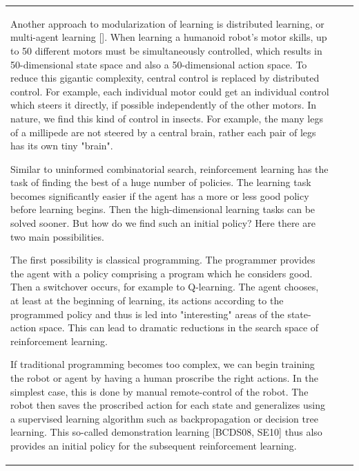 \documentclass[10pt]{book}
\begin{document}
\begin{center}
\begin{tabular}{|l|l|l|}
Another approach to modularization of learning is distributed learning, or multi-agent learning [\cite{pl05}]. When learning a humanoid robot's motor skills, up to 50 different motors must be simultaneously controlled, which results in 50-dimensional state space and also a 50-dimensional action space. To reduce this gigantic complexity, central control is replaced by distributed control. For example, each individual motor could get an individual control which steers it directly, if possible independently of the other motors. In nature, we find this kind of control in insects. For example, the many legs of a millipede are not steered by a central brain, rather each pair of legs has its own tiny "brain".

Similar to uninformed combinatorial search, reinforcement learning has the task of finding the best of a huge number of policies. The learning task becomes significantly easier if the agent has a more or less good policy before learning begins. Then the high-dimensional learning tasks can be solved sooner. But how do we find such an initial policy? Here there are two main possibilities.

The first possibility is classical programming. The programmer provides the agent with a policy comprising a program which he considers good. Then a switchover occurs, for example to Q-learning. The agent chooses, at least at the beginning of learning, its actions according to the programmed policy and thus is led into "interesting" areas of the state-action space. This can lead to dramatic reductions in the search space of reinforcement learning.

If traditional programming becomes too complex, we can begin training the robot or agent by having a human proscribe the right actions. In the simplest case, this is done by manual remote-control of the robot. The robot then saves the proscribed action for each state and generalizes using a supervised learning algorithm such as backpropagation or decision tree learning. This so-called demonstration learning [BCDS08, SE10] thus also provides an initial policy for the subsequent reinforcement learning.


\end{tabular}
\end{center}
\end{document}
